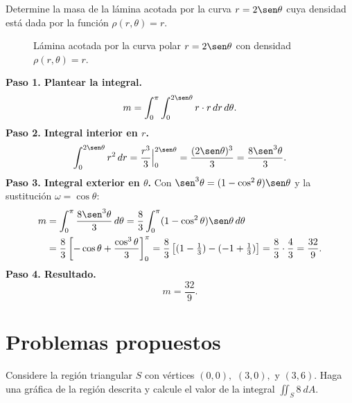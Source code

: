 \begin{prob}
Determine la masa de la lámina acotada por la curva $r=2\sen \theta$ cuya densidad está dada por la función $\rho(r,\theta)=r.$
\begin{myproof}
\begin{figure}[H]
\centering
{}
\caption{Lámina acotada por la curva polar $r=2\sen\theta$ con densidad $\rho(r,\theta)=r$.}
\label{fig:lamina_polar_masa}
\end{figure}
\textbf{Paso 1. Plantear la integral.}
\[
m=\int_{0}^{\pi}\int_{0}^{2\sen\theta} r\cdot r\,dr\,d\theta.
\]
\textbf{Paso 2. Integral interior en $r$.}
\[
\int_{0}^{2\sen\theta}r^2\,dr=\frac{r^3}{3}\Big|_{0}^{2\sen\theta}=\frac{(2\sen\theta)^3}{3}=\frac{8\sen^3\theta}{3}.
\]
\textbf{Paso 3. Integral exterior en $\theta$.} Con $\sen^3\theta=(1-\cos^2\theta)\sen\theta$ y la sustitución $\omega=\cos\theta$:
\begin{align*}
m&=\int_{0}^{\pi}\frac{8\sen^3\theta}{3}\,d\theta
=\frac{8}{3}\int_{0}^{\pi}(1-\cos^2\theta)\sen\theta\,d\theta\\
&=\frac{8}{3}\left[-\cos\theta+\frac{\cos^3\theta}{3}\right]_0^{\pi}
=\frac{8}{3}\left[(1-\tfrac{1}{3})-(-1+\tfrac{1}{3})\right]
=\frac{8}{3}\cdot\frac{4}{3}=\frac{32}{9}.
\end{align*}
\textbf{Paso 4. Resultado.}
\[
\boxed{m=\frac{32}{9}.}
\]
\end{myproof}
\end{prob}




\section{Problemas propuestos}


\begin{prob}
Considere la región triangular $S$ con vértices $(0,0),$ $(3,0),$ y $(3,6).$ Haga una gráfica de la región descrita y calcule el valor de la integral $\displaystyle\iint_{S}8\ dA.$
\end{prob}


